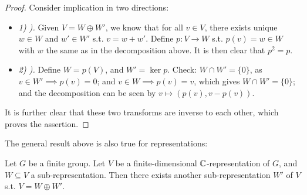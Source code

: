 \documentclass{article}
\begin{document}
\begin{proof}
    Consider implication in two directions:
    \begin{itemize}
        \item \emph{1) ).} Given $V = W \oplus W'$, we know that for all $v \in V$, there exists unique $w \in W$ and $w' \in W'$ s.t. $v = w + w'$. Define $p: V \to W$ s.t. $p(v) = w \in W$ with $w$ the same as in the decomposition above. It is then clear that $p^2 = p$.
        \item \emph{2) ).} Define $W = p(V)$, and $W' = \ker p$. Check: $W \cap W' = \{0\}$, as $v \in W' \implies p(v) = 0$; and $v \in W \implies p(v) = v$, which gives $W \cap W' = \{0\}$; and the decomposition can be seen by $v \mapsto (p(v), v - p(v))$.
    \end{itemize}
    It is further clear that these two transforms are inverse to each other, which proves the assertion.
\end{proof}

\textstart
The general result above is also true for representations:
\begin{theorem}\label{thm: decomposition of repr.}
    Let $G$ be a finite group. Let $V$ be a finite-dimensional $\mathbb{C}$-representation of $G$, and $W \subseteq V$ a sub-representation. Then there exists another sub-representation $W'$ of $V$ s.t. $V = W \oplus W'$.
\end{theorem}
\end{document}
